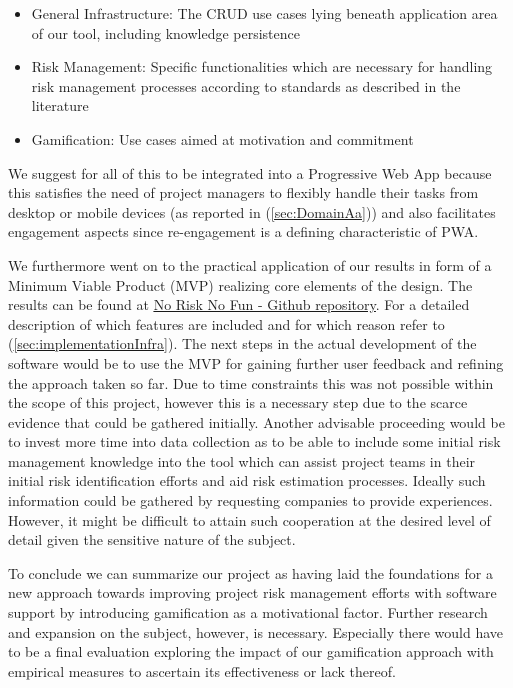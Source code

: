 \begin{itemize}
	\item General Infrastructure: The CRUD use cases lying beneath application area of our tool, including knowledge persistence 
	\item Risk Management: Specific functionalities which are necessary for handling risk management processes according to standards as described in the literature
	\item Gamification: Use cases aimed at motivation and commitment
\end{itemize}

We suggest for all of this to be integrated into a Progressive Web App because this satisfies the need of project managers to flexibly handle their tasks from desktop or mobile devices (as reported in (\ref{sec:DomainAa})) and also facilitates engagement aspects since re-engagement is a defining characteristic of PWA.

We furthermore went on to the practical application of our results in form of a Minimum Viable Product (MVP) realizing core elements of the design. The results can be found at
\underline{\href{https://github.com/Risk-Busters/NoRiskNoFun}{No Risk No Fun - Github repository}}. For a detailed description of which features are included and for which reason refer to (\ref{sec:implementationInfra}).
The next steps in the actual development of the software would be to use the MVP for gaining further user feedback and refining the approach taken so far. Due to time constraints this was not possible within the scope of this project, however this is a necessary step  due to the scarce evidence that could be gathered initially.
Another advisable proceeding would be to invest more time into data collection as to be able to include some initial risk management knowledge into the tool which can assist project teams in their initial risk identification efforts and aid risk estimation processes. Ideally such information could be gathered by requesting companies to provide experiences. However, it might be difficult to attain such cooperation at the desired level of detail given the sensitive nature of the subject.

To conclude we can summarize our project as having laid the foundations for a new approach towards improving project risk management efforts with software support by introducing gamification as a motivational factor. Further research and expansion on the subject, however, is necessary. Especially there would have to be a final evaluation exploring the impact of our gamification approach with empirical measures to ascertain its effectiveness or lack thereof.




